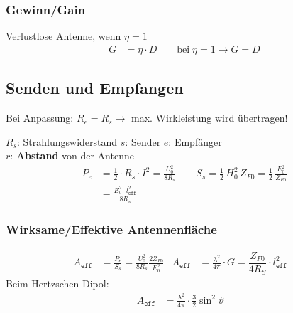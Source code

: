 \subsubsection{Gewinn/Gain}
Verlustlose Antenne, wenn $ \eta = 1 $
\begin{align*}
    G & = \eta \cdot D \qquad \text{bei}\;  \eta=1 \rightarrow  G=D
\end{align*}


\subsection{Senden und Empfangen}
Bei Anpassung: $R_e = R_s \rightarrow$ max. Wirkleistung wird übertragen!


$ R_s $: Strahlungswiderstand \quad $ s $: Sender \qquad $ e $: Empfänger\\
$ r $: \textbf{Abstand} von der Antenne
\begin{align*}
	P_e &= \frac{1}{2}\cdot R_s \cdot I^2 = \frac{U_0^2}{8R_{s}} \qquad S_s = \frac{1}{2}\, H_0^2 \, Z_{F0} = \frac{1}{2} \, \frac{E_0^2}{Z_{F0}}  \\
	&= \frac{E_0^2\cdot l^2_{\mathtt{eff}}}{8R_{s}}
\end{align*}
\subsubsection{Wirksame/Effektive Antennenfläche}
\begin{align*}
	A_\texttt{eff} & = \frac{P_e}{S_s} = \frac{U_0^2}{8R_{s}}\frac{2Z_{F0}}{E_0^2} &
	A_\texttt{eff} & = \frac{\lambda^2}{4\pi}\cdot G = \dfrac{Z_{F0}}{4 R_S} \cdot l_\texttt{eff}^2&
\end{align*}
Beim Hertzschen Dipol:
\begin{align*}
	A_\texttt{eff} & =  \frac{\lambda^2}{4\pi}\cdot\frac{3}{2}\sin^2\vartheta &
\end{align*}
